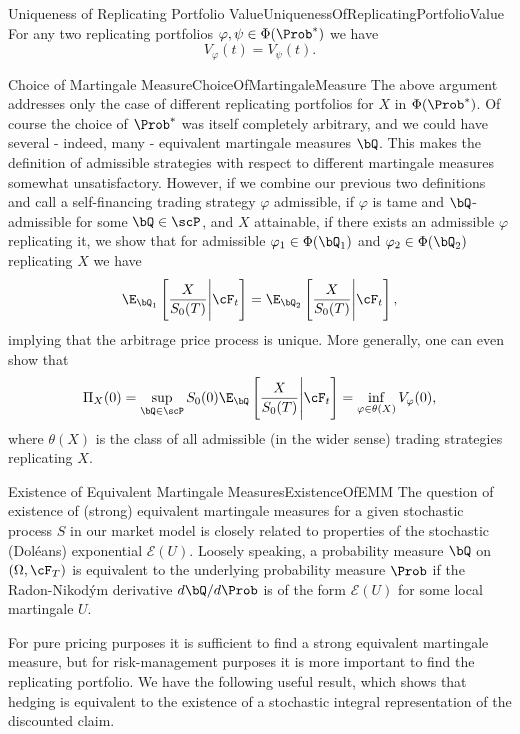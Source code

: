 \begin{cor}{Uniqueness of Replicating Portfolio Value}{UniquenessOfReplicatingPortfolioValue}
	For any two replicating portfolios \(\varphi, \psi \in \Phi(\Prob^*)\) we have
	\[
		V_{\varphi}(t) = V_{\psi}(t).
	\]
\end{cor}

\begin{xattention}{Choice of Martingale Measure}{ChoiceOfMartingaleMeasure}
	The above argument addresses only the case of different replicating portfolios for \(X\) in \(\Phi(\Prob^*)\). Of course the choice of \(\Prob^*\) was itself completely arbitrary, and we could have several - indeed, many - equivalent martingale measures \(\bQ\). This makes the definition of admissible strategies with respect to different martingale measures somewhat unsatisfactory. However, if we combine our previous two definitions and call a self-financing trading strategy \(\varphi\) admissible, if \(\varphi\) is tame and \(\bQ\)-admissible for some \(\bQ \in \scP\), and \(X\) attainable, if there exists an admissible \(\varphi\) replicating it, we show that for admissible \(\varphi_1 \in \Phi(\bQ_1)\) and \(\varphi_2 \in \Phi(\bQ_2)\) replicating \(X\) we have
	\[
		\E_{\bQ_1} \left[ \frac{X}{S_0(T)} \Bigg| \cF_t \right] = \E_{\bQ_2} \left[ \frac{X}{S_0(T)} \Bigg| \cF_t \right],
	\]
	implying that the arbitrage price process is unique. More generally, one can even show that
	\[
		\Pi_X(0) = \sup_{\bQ \in \scP} S_0(0)\E_{\bQ} \left[ \frac{X}{S_0(T)} \Bigg| \cF_t \right] = \inf_{\varphi \in \theta(X)} V_{\varphi}(0),
	\]
	where \(\theta(X)\) is the class of all admissible (in the wider sense) trading strategies replicating \(X\).
\end{xattention}

\begin{xtip}{Existence of Equivalent Martingale Measures}{ExistenceOfEMM}
	The question of existence of (strong) equivalent martingale measures for a given stochastic process \(S\) in our market model is closely related to properties of the stochastic (Doléans) exponential \(\mathcal{E}(U)\). Loosely speaking, a probability measure \(\bQ\) on \((\Omega, \cF_T)\) is equivalent to the underlying probability measure \(\Prob\) if the Radon-Nikodým derivative \(d\bQ/d\Prob\) is of the form \(\mathcal{E}(U)\) for some local martingale \(U\).
\end{xtip}

For pure pricing purposes it is sufficient to find a strong equivalent martingale measure, but for risk-management purposes it is more important to find the replicating portfolio. We have the following useful result, which shows that hedging is equivalent to the existence of a stochastic integral representation of the discounted claim.

